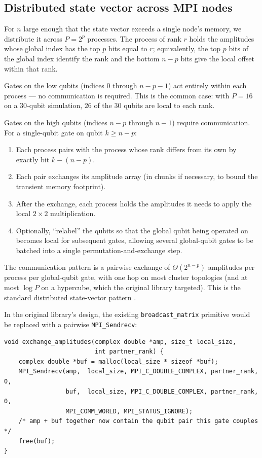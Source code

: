 \subsection{Distributed state vector across MPI nodes}

For $n$ large enough that the state vector exceeds a single node's memory, we distribute it across $P = 2^p$ processes. The process of rank $r$ holds the amplitudes whose global index has the top $p$ bits equal to $r$; equivalently, the top $p$ bits of the global index identify the rank and the bottom $n-p$ bits give the local offset within that rank.

Gates on the low qubits (indices $0$ through $n-p-1$) act entirely within each process --- no communication is required. This is the common case: with $P=16$ on a 30-qubit simulation, $26$ of the $30$ qubits are local to each rank.

Gates on the high qubits (indices $n-p$ through $n-1$) require communication. For a single-qubit gate on qubit $k\geq n-p$:
\begin{enumerate}
\item Each process pairs with the process whose rank differs from its own by exactly bit $k-(n-p)$.
\item Each pair exchanges its amplitude array (in chunks if necessary, to bound the transient memory footprint).
\item After the exchange, each process holds the amplitudes it needs to apply the local $2\times 2$ multiplication.
\item Optionally, ``relabel'' the qubits so that the global qubit being operated on becomes local for subsequent gates, allowing several global-qubit gates to be batched into a single permutation-and-exchange step.
\end{enumerate}

The communication pattern is a pairwise exchange of $\Theta(2^{n-p})$ amplitudes per process per global-qubit gate, with one hop on most cluster topologies (and at most $\log P$ on a hypercube, which the original library targeted). This is the standard distributed state-vector pattern \cite{smelyanskiy2016}.

In the original library's design, the existing \verb|broadcast_matrix| primitive would be replaced with a pairwise \verb|MPI_Sendrecv|:

\begin{lstlisting}[caption={Pairwise amplitude exchange used for gates on global qubits.}]
void exchange_amplitudes(complex double *amp, size_t local_size,
                         int partner_rank) {
    complex double *buf = malloc(local_size * sizeof *buf);
    MPI_Sendrecv(amp,  local_size, MPI_C_DOUBLE_COMPLEX, partner_rank, 0,
                 buf,  local_size, MPI_C_DOUBLE_COMPLEX, partner_rank, 0,
                 MPI_COMM_WORLD, MPI_STATUS_IGNORE);
    /* amp + buf together now contain the qubit pair this gate couples */
    free(buf);
}
\end{lstlisting}

